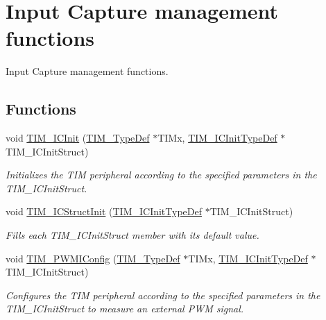 \hypertarget{group___t_i_m___group3}{}\section{Input Capture management functions}
\label{group___t_i_m___group3}


Input Capture management functions.  


\subsection*{Functions}
\begin{DoxyCompactItemize}
\item 
void \hyperlink{group___t_i_m___group3_ga9e6a153dd6552e4e1188eba227316f7f}{T\+I\+M\+\_\+\+I\+C\+Init} (\hyperlink{struct_t_i_m___type_def}{T\+I\+M\+\_\+\+Type\+Def} $\ast$T\+I\+Mx, \hyperlink{struct_t_i_m___i_c_init_type_def}{T\+I\+M\+\_\+\+I\+C\+Init\+Type\+Def} $\ast$T\+I\+M\+\_\+\+I\+C\+Init\+Struct)
\begin{DoxyCompactList}\small\item\em Initializes the T\+IM peripheral according to the specified parameters in the T\+I\+M\+\_\+\+I\+C\+Init\+Struct. \end{DoxyCompactList}\item 
void \hyperlink{group___t_i_m___group3_ga5005dac8e4e8a4c7fc2a0ef05b77cc50}{T\+I\+M\+\_\+\+I\+C\+Struct\+Init} (\hyperlink{struct_t_i_m___i_c_init_type_def}{T\+I\+M\+\_\+\+I\+C\+Init\+Type\+Def} $\ast$T\+I\+M\+\_\+\+I\+C\+Init\+Struct)
\begin{DoxyCompactList}\small\item\em Fills each T\+I\+M\+\_\+\+I\+C\+Init\+Struct member with its default value. \end{DoxyCompactList}\item 
void \hyperlink{group___t_i_m___group3_gaa71f9296556310f85628d6c748a06475}{T\+I\+M\+\_\+\+P\+W\+M\+I\+Config} (\hyperlink{struct_t_i_m___type_def}{T\+I\+M\+\_\+\+Type\+Def} $\ast$T\+I\+Mx, \hyperlink{struct_t_i_m___i_c_init_type_def}{T\+I\+M\+\_\+\+I\+C\+Init\+Type\+Def} $\ast$T\+I\+M\+\_\+\+I\+C\+Init\+Struct)
\begin{DoxyCompactList}\small\item\em Configures the T\+IM peripheral according to the specified parameters in the T\+I\+M\+\_\+\+I\+C\+Init\+Struct to measure an external P\+WM signal. \end{DoxyCompactList}\item 

\end{DoxyCompactItemize}
